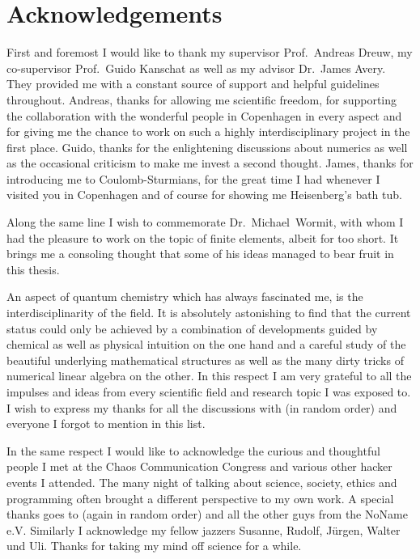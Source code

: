 \chapter*{Acknowledgements} 
{}

First and foremost I would like to thank
my supervisor Prof.~Andreas Dreuw,
my co-supervisor Prof.~Guido Kanschat
as well as my advisor Dr.~James Avery.
They provided me with a constant source of support
and helpful guidelines throughout.
Andreas, thanks for allowing me scientific freedom,
for supporting the collaboration with the wonderful people in Copenhagen in every aspect
and for giving me the chance to work on such
a highly interdisciplinary project in the first place.
Guido, thanks for the enlightening discussions about numerics
as well as the occasional criticism to make me invest a second thought.
James, thanks for introducing me to Coulomb-Sturmians,
for the great time I had whenever I visited you in Copenhagen
and of course for showing me Heisenberg's bath tub.

Along the same line I wish to commemorate Dr.~Michael~Wormit,
with whom I had the pleasure to work on the topic of finite elements,
albeit for too short.
It brings me a consoling thought that some of his
ideas managed to bear fruit in this thesis.


An aspect of quantum chemistry
which has always fascinated me,
is the interdisciplinarity of the field.
It is absolutely astonishing
to find that the current status could only be achieved
by a combination of developments guided by chemical as well as physical intuition
on the one hand
and a careful study of the beautiful underlying mathematical structures
as well as the many dirty tricks of numerical linear algebra on the other.
In this respect I am very grateful
to all the impulses and ideas from
every scientific field and research topic I was exposed to.
I wish to express my thanks for all the discussions with
(in random order)
%
and everyone I forgot to mention in this list.


In the same respect I would like to acknowledge the curious and thoughtful
people I met at the Chaos Communication Congress
and various other hacker events I attended.
The many night of talking
about science, society, ethics and programming often brought a
different perspective to my own work.
A special thanks goes to 
(again in random order)
%
and all the other guys from the NoName e.V.
Similarly I acknowledge my fellow jazzers
Susanne, Rudolf, Jürgen, Walter und Uli.
Thanks for taking my mind off science for a while.

